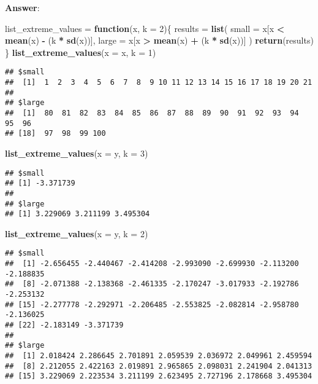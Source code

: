 \documentclass[]{article}
\newenvironment{Shaded}{\begin{snugshade}}{\end{snugshade}}
\newcommand{\KeywordTok}[1]{\textcolor[rgb]{0.13,0.29,0.53}{\textbf{#1}}}
\newcommand{\DataTypeTok}[1]{\textcolor[rgb]{0.13,0.29,0.53}{#1}}
\newcommand{\DecValTok}[1]{\textcolor[rgb]{0.00,0.00,0.81}{#1}}
\newcommand{\StringTok}[1]{\textcolor[rgb]{0.31,0.60,0.02}{#1}}
\newcommand{\ControlFlowTok}[1]{\textcolor[rgb]{0.13,0.29,0.53}{\textbf{#1}}}
\newcommand{\OperatorTok}[1]{\textcolor[rgb]{0.81,0.36,0.00}{\textbf{#1}}}
\newcommand{\NormalTok}[1]{#1}
\begin{document}
\textbf{Answer}:

\begin{Shaded}
\begin{Highlighting}[]
\NormalTok{list_extreme_values =}\StringTok{ }\ControlFlowTok{function}\NormalTok{(x, }\DataTypeTok{k =} \DecValTok{2}\NormalTok{)\{}
\NormalTok{  results =}\StringTok{ }\KeywordTok{list}\NormalTok{(}
    \DataTypeTok{small =}\NormalTok{ x[x }\OperatorTok{<}\StringTok{ }\KeywordTok{mean}\NormalTok{(x) }\OperatorTok{-}\StringTok{ }\NormalTok{(k }\OperatorTok{*}\StringTok{ }\KeywordTok{sd}\NormalTok{(x))],}
    \DataTypeTok{large =}\NormalTok{ x[x }\OperatorTok{>}\StringTok{ }\KeywordTok{mean}\NormalTok{(x) }\OperatorTok{+}\StringTok{ }\NormalTok{(k }\OperatorTok{*}\StringTok{ }\KeywordTok{sd}\NormalTok{(x))]}
\NormalTok{  )}
  \KeywordTok{return}\NormalTok{(results)}
\NormalTok{\}}
\KeywordTok{list_extreme_values}\NormalTok{(}\DataTypeTok{x =}\NormalTok{ x, }\DataTypeTok{k =} \DecValTok{1}\NormalTok{)}
\end{Highlighting}
\end{Shaded}

\begin{verbatim}
## $small
##  [1]  1  2  3  4  5  6  7  8  9 10 11 12 13 14 15 16 17 18 19 20 21
## 
## $large
##  [1]  80  81  82  83  84  85  86  87  88  89  90  91  92  93  94  95  96
## [18]  97  98  99 100
\end{verbatim}

\begin{Shaded}
\begin{Highlighting}[]
\KeywordTok{list_extreme_values}\NormalTok{(}\DataTypeTok{x =}\NormalTok{ y, }\DataTypeTok{k =} \DecValTok{3}\NormalTok{)}
\end{Highlighting}
\end{Shaded}

\begin{verbatim}
## $small
## [1] -3.371739
## 
## $large
## [1] 3.229069 3.211199 3.495304
\end{verbatim}

\begin{Shaded}
\begin{Highlighting}[]
\KeywordTok{list_extreme_values}\NormalTok{(}\DataTypeTok{x =}\NormalTok{ y, }\DataTypeTok{k =} \DecValTok{2}\NormalTok{)}
\end{Highlighting}
\end{Shaded}

\begin{verbatim}
## $small
##  [1] -2.656455 -2.440467 -2.414208 -2.993090 -2.699930 -2.113200 -2.188835
##  [8] -2.071388 -2.138368 -2.461335 -2.170247 -3.017933 -2.192786 -2.253132
## [15] -2.277778 -2.292971 -2.206485 -2.553825 -2.082814 -2.958780 -2.136025
## [22] -2.183149 -3.371739
## 
## $large
##  [1] 2.018424 2.286645 2.701891 2.059539 2.036972 2.049961 2.459594
##  [8] 2.212055 2.422163 2.019891 2.965865 2.098031 2.241904 2.041313
## [15] 3.229069 2.223534 3.211199 2.623495 2.727196 2.178668 3.495304
\end{verbatim}
\end{document}

